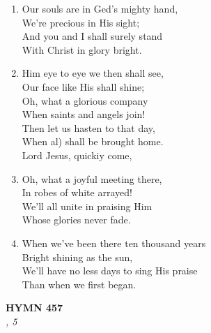 \documentclass[11pt,a4paper]{article}
\begin{document}
\begin{enumerate}
    \item Our souls are in Ged's mighty hand, \\
        We're precious in His sight; \\
        And you and I shall surely stand \\
        With Christ in glory bright.

    \item Him eye to eye we then shall see, \\
        Our face like His shall shine; \\
        Oh, what a glorious company \\
        When saints and angels join! \\
        Then let us hasten to that day, \\
        When al) shall be brought home. \\
        Lord Jesus, quickiy come,

    \item Oh, what a joyful meeting there, \\
        In robes of white arrayed! \\
        We'll all unite in praising Him \\
        Whose glories never fade.

    \item When we've been there ten thousand years \\
        Bright shining as the sun, \\
        We'll have no less days to sing His praise \\
        Than when we first began.

\end{enumerate}

\newpage
\begin{center}
    {\Large \textbf{HYMN 457}}
    \\
    \textit{, 5}
\end{center}
\vspace{1em}
\end{document}
